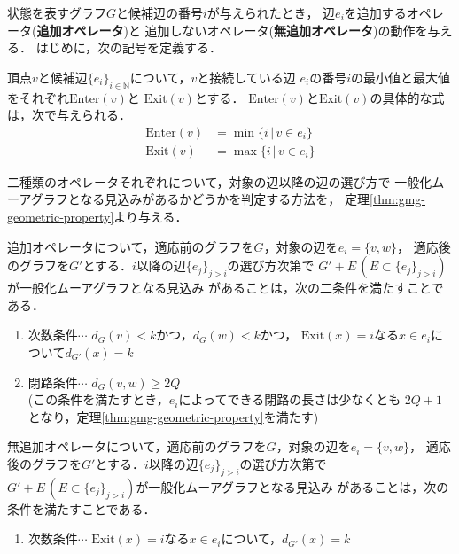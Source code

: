 状態を表すグラフ$G$と候補辺の番号$i$が与えられたとき，
辺$e_i$を追加するオペレータ(\textbf{追加オペレータ})と
追加しないオペレータ(\textbf{無追加オペレータ})の動作を与える．
はじめに，次の記号を定義する．
\begin{definition}
  頂点$v$と候補辺$\{e_i\}_{i\in\mathbb{N}}$について，$v$と接続している辺
  $e_i$の番号$i$の最小値と最大値をそれぞれ$\text{Enter}(v)$と
  $\text{Exit}(v)$とする．
  $\text{Enter}(v)$と$\text{Exit}(v)$の具体的な式は，次で与えられる．
  \begin{equation}
    \label{eq:frontier}
    \begin{aligned}
    \text{Enter}(v) &= \min\{i\,|\,v\in e_i\} \\
    \text{Exit}(v) &= \max\{i\,|\,v\in e_i\}
    \end{aligned}
  \end{equation}
\end{definition}
二種類のオペレータそれぞれについて，対象の辺以降の辺の選び方で
一般化ムーアグラフとなる見込みがあるかどうかを判定する方法を，
定理\ref{thm:gmg-geometric-property}より与える．
\begin{collary-without-proof}
  \label{coll:basic-add-operator}
  追加オペレータについて，適応前のグラフを$G$，対象の辺を$e_i=\{v,w\}$，
  適応後のグラフを$G'$とする．$i$以降の辺$\{e_j\}_{j>i}$の選び方次第で
  $G'+E\,(E\subset \{e_j\}_{j>i})$が一般化ムーアグラフとなる見込み
  があることは，次の二条件を満たすことである．
  \begin{enumerate}
  \item 次数条件$\cdots$ $d_G(v)<k$かつ，$d_G(w)<k$かつ，
    $\text{Exit}(x)=i$なる$x\in e_i$について$d_{G'}(x)=k$
  \item 閉路条件$\cdots$ $d_G(v,w)\geq2Q$\\
    (この条件を満たすとき，$e_i$によってできる閉路の長さは少なくとも
    $2Q+1$となり，定理\ref{thm:gmg-geometric-property}を満たす)
  \end{enumerate}
\end{collary-without-proof}
\begin{collary-without-proof}
  \label{coll:basic-noadd-operator}
  無追加オペレータについて，適応前のグラフを$G$，対象の辺を$e_i=\{v,w\}$，
  適応後のグラフを$G'$とする．$i$以降の辺$\{e_j\}_{j>i}$の選び方次第で
  $G'+E\,(E\subset \{e_j\}_{j>i})$が一般化ムーアグラフとなる見込み
  があることは，次の条件を満たすことである．
  \begin{enumerate}
  \item 次数条件$\cdots$ $\text{Exit}(x)=i$なる$x\in e_i$について，$d_{G'}(x)=k$
  \end{enumerate}
\end{collary-without-proof}
